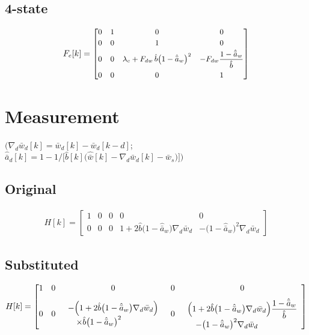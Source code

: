 \documentclass[11pt,a4paper,fontset=none]{ctexart}
\newcommand{\ba}{\bar{a}}
\newcommand{\bw}{\bar{w}}
\newcommand{\ah}{\hat{\ba}_w}
\newcommand{\bh}{\hat{b}}
\newcommand{\wh}{\hat{\bw}}
\newcommand{\ad}{\hat{\ba}_d}
\begin{document}
\begin{landscape}
\subsection*{4-state}

\begin{align*}
F_e[k] = {\small\begin{bmatrix}
0 & 1 & 0 & 0 \\[2pt]
0 & 0 & 1 & 0 \\[2pt]
0 & 0 & \lambda_c + F_{dw}\,\bh\bigl(1-\ah\bigr)^{2} & -F_{dw}\dfrac{1-\ah}{\bh} \\[8pt]
0 & 0 & 0 & 1
\end{bmatrix}}
\end{align*}
\end{landscape}

\section{Measurement}

$\bigl(\nabla_d\bw_d[k] = \bw_d[k] - \bw_d[k-d]$;\ \
$\ad[k] = 1 - 1/\bigl[\bh[k]\bigl(\wh[k] - \nabla_d\bw_d[k] - \bw_s\bigr)\bigr]\bigr)$

\subsection*{Original}

\begin{align*}
H[k] = \begin{bmatrix}
1 & 0 & 0 & 0 & 0 \\[2pt]
0 & 0 & 0 & 1 + 2\bh\bigl(1-\ah\bigr)\nabla_d\bw_d & -\bigl(1-\ah\bigr)^{2}\nabla_d\bw_d
\end{bmatrix}
\end{align*}

\subsection*{Substituted}

\begin{align*}
H[k] = \begin{bmatrix}
1 & 0 & 0 & 0 & 0 \\[6pt]
0 & 0 &
  \begin{array}{l} -\Bigl(1 + 2\bh\bigl(1-\ah\bigr)\nabla_d\bw_d\Bigr) \\[2pt] \quad \times\bh\bigl(1-\ah\bigr)^{2} \end{array} & 0 &
  \begin{array}{l} \Bigl(1 + 2\bh\bigl(1-\ah\bigr)\nabla_d\bw_d\Bigr)\dfrac{1-\ah}{\bh} \\[4pt] \quad - \bigl(1-\ah\bigr)^{2}\nabla_d\bw_d \end{array}
\end{bmatrix}
\end{align*}
\end{document}

